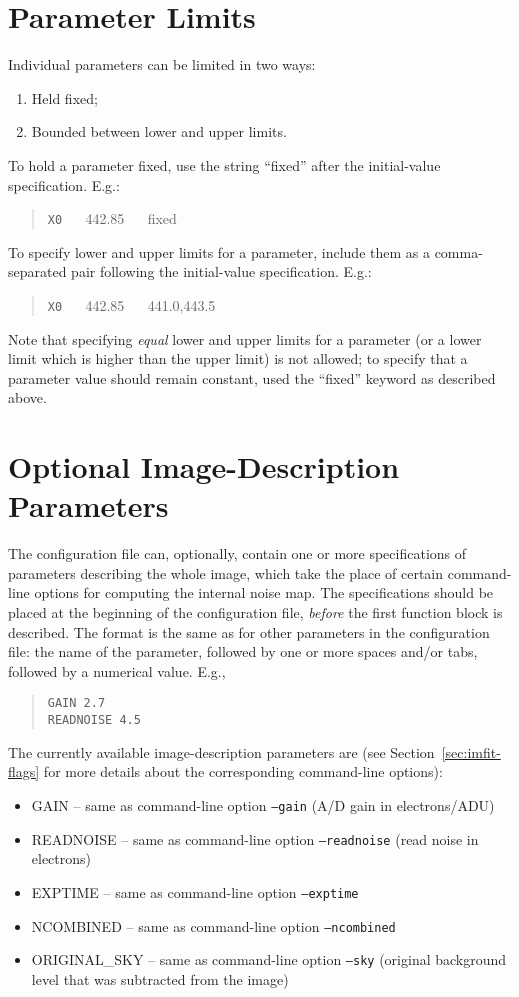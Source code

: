 \documentclass[10pt,a4paper,article]{memoir}
\begin{document}
\section{Parameter Limits}\label{sec:param-limits}

Individual parameters can be limited in two ways:
\begin{enumerate}
\item Held fixed;
\item Bounded between lower and upper limits.
\end{enumerate}
To hold a parameter fixed, use the string ``fixed'' after the initial-value
specification. E.g.:
\begin{quote}
\texttt{X0} ~~ 442.85 ~~ fixed
\end{quote}
To specify lower and upper limits for a parameter, include them as a comma-separated
pair following the initial-value specification. E.g.:
\begin{quote}
\texttt{X0} ~~ 442.85 ~~ 441.0,443.5
\end{quote}
Note that specifying \textit{equal} lower and upper limits for a parameter (or a lower limit
which is higher than the upper limit) is not allowed; to specify that a parameter
value should remain constant, used the ``fixed'' keyword as described above.


\section{Optional Image-Description Parameters}

The configuration file can, optionally, contain one or more specifications of 
parameters describing the whole image, which take the place of certain command-line
options for computing the internal noise map.  The specifications should be placed
at the beginning of the configuration file, \textit{before} the first function
block is described. The format is the same as for other parameters in the configuration
file: the name of the parameter, followed by one or more spaces and/or tabs, followed
by a numerical value. E.g.,
\begin{quote}
  \texttt{GAIN  2.7} \\
  \texttt{READNOISE  4.5} \\
\end{quote}

The currently available image-description parameters are (see Section~\ref{sec:imfit-flags} for more
details about the corresponding command-line options):
\begin{itemize}
\item GAIN -- same as command-line option \texttt{--gain} (A/D gain in electrons/ADU)
\item READNOISE -- same as command-line option \texttt{--readnoise} (read noise in electrons)
\item EXPTIME -- same as command-line option \texttt{--exptime}
\item NCOMBINED -- same as command-line option \texttt{--ncombined}
\item ORIGINAL\_SKY -- same as command-line option \texttt{--sky} (original
background level that was subtracted from the image)
\end{itemize}
\end{document}
